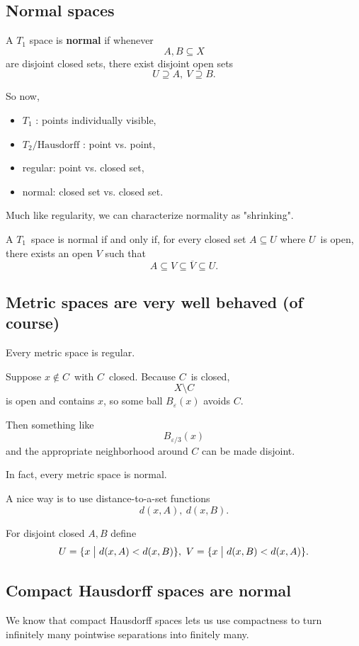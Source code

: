 \documentclass[11pt]{article}
\begin{document}
\subsection{Normal spaces}

A $T_1$ space is \textbf{normal} if whenever 
\[
    A,B \subseteq X
\]
are disjoint closed sets, there exist 
disjoint open sets 
\[
    U \supseteq A, \ V \supseteq B.
\]

So now, 
\begin{itemize}
    \item $T_1$ : points individually visible, 
    \item $T_2/\text{Hausdorff}$ : point vs. point, 
    \item regular: point vs. closed set, 
    \item normal: closed set vs. closed set.
\end{itemize}

Much like regularity, we can 
characterize normality as "shrinking". 

A $T_1$ space is normal if and only if, 
for every closed set $A \subseteq U$ where $U$ is open, 
there exists an open $V$ such that 
\[
    A \subseteq V \subseteq \overline V \subseteq U. 
\]

\subsection{Metric spaces are very well behaved (of course)}
Every metric space is regular. 

Suppose $x \not\in C$ with $C$ closed. 
Because $C$ is closed, 
\[
    X \setminus C
\]
is open and contains $x$, so some ball 
$B_{\varepsilon}(x)$ avoids $C$. 

Then something like 
\[
    B_{\varepsilon/3}(x)
\]
and the appropriate neighborhood around $C$ 
can be made disjoint. 

In fact, every metric space is normal. 

A nice way is to use distance-to-a-set functions 
\[
    d(x,A), \ d(x,B). 
\]

For disjoint closed $A,B$ define 
\[
    U = \{x \bigm| d(x,A) < d(x,B)\}, \ 
    V = \{x \bigm| d(x,B) < d(x,A)\}. 
\]

\subsection{Compact Hausdorff spaces are normal}

We know that compact Hausdorff spaces lets us 
use compactness to turn infinitely many 
pointwise separations into finitely many. 
\end{document}
